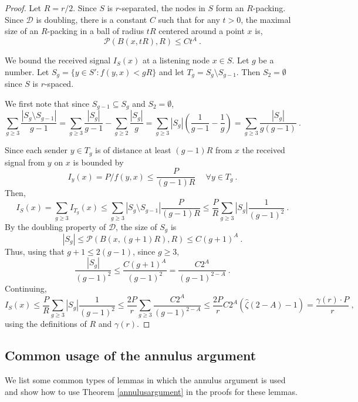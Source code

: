 \documentclass[11pt]{amsart}
\newcounter{foo}
\newtheorem{theorem}[foo]{Theorem}
\def\calD{{\mathcal{D}}}
\begin{document}
\iffalse \begin{theorem}\label{annulusargument}
Let $S$ be a set of nodes 
inducing decay space $\calD = (V,f)$  with Assouad dimension $A < 1$.
If $S$ is $r$-separated, with $r \ge  \psi P/p$,
then the total interference on any node $v$ in $S$ is at most a constant $p$ with respect to uniform power $P$.
\end{theorem}
\fi

\begin{proof}
Let $R = r/2$.
Since $S$ is $r$-separated, the nodes in $S$ form an $R$-packing.
Since $\calD$ is doubling, there is a constant $C$ such that  for any $t > 0$, 
the maximal size of an $R$-packing in a ball of radius $tR$ centered around a point $x$ is, 
\begin{equation}
\mathcal{P}(B(x, tR),R) \leq C t ^A\ .
\end{equation}

We bound the received signal $I_S(x)$ at a listening node $x \in S$.
Let $g$ be a number.
Let $S_g = \{ y \in S' : f(y, x)< gR\}$ and let $T_g = S_g \setminus S_{g-1}$.
Then $S_2 = \emptyset$ since $S$ is $r$-spaced.

We first note that since $S_{g-1} \subseteq S_g$ and $S_2 = \emptyset$,
\[ \sum_{g \ge 3} \frac{|S_g \setminus S_{g-1}|}{g-1} 
= \sum_{g \ge 3} \frac{|S_g|}{g-1} - \sum_{g \ge 2} \frac{|S_g|}{g}
  = \sum_{g \ge 3} |S_g| \left(\frac{1}{g-1} - \frac{1}{g}\right) 
  = \sum_{g \ge 3} \frac{|S_g|}{g(g-1)} \ . \]


Since each sender $y \in T_g$ is of distance at least $(g-1)R$ from $x$
the received signal from $y$ on $x$ is bounded by
$$I_y(x) = P/f(y, x)\leq \frac{P}{(g-1)R}\ \quad \forall y \in T_g\ .$$
Then,
\[ I_S(x) = \sum_{g \geq 3} I_{T_g}(x)
   \le \sum_{g \geq 3}|S_g \setminus S_{g-1}| \frac{P}{(g-1)R}
   \le \frac{P}{R} \sum_{g \geq 3} |S_g| \frac{1}{(g-1)^2}\ . \]
By the doubling property of $\calD$, the size of $S_g$ is 
  $$|S_g| \le \mathcal{P}(B(x,(g+1)R),R) \leq C(g+1)^A\ .$$
Thus, using that $g+1 \le 2(g-1)$, since $g\geq 3$,
  $$ \frac{|S_g|}{(g-1)^2} \leq \frac{C(g+1)^A}{(g-1)^2} = \frac{C 2^A}{(g-1)^{2-A}}\ .$$
Continuing,
  $$I_S(x) \leq \frac{P}{R} \sum_{g \geq 3} |S_g| \frac{1}{(g-1)^2} \leq \frac{2P}{r} \sum_{g \geq 3} \frac{C 2^A}{(g-1)^{2-A}} 
\leq \frac{2P}{r} C 2 ^A \left( \hat{\zeta}(2-A) -1 \right) =
\frac{\gamma(r) \cdot P}{r}\ ,$$
using the definitions of $R$ and $\gamma(r)$.
\end{proof}



\subsection{Common usage of the annulus argument}
We list some common types of lemmas in which the annulus argument is used and show how to use Theorem \ref{annulusargument} in the proofs for these lemmas.
\end{document}
